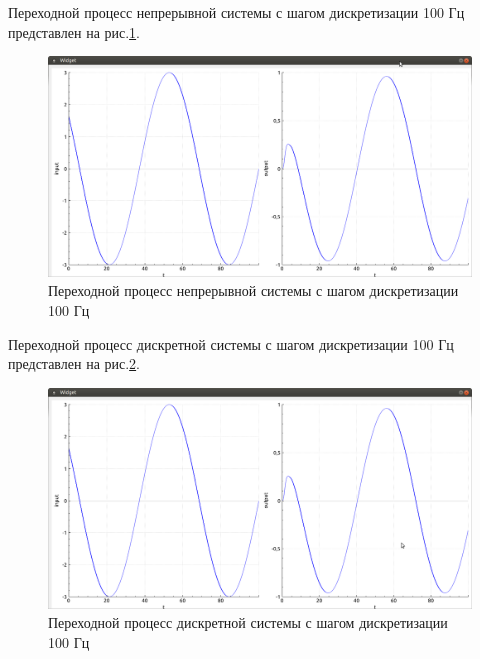 \documentclass[14pt,a4paper]{extreport}
\begin{document}
Переходной процесс непрерывной системы с шагом дискретизации 
100 Гц представлен на рис.\ref{fig:con_100hz}.
\begin{figure}[H]
    \centering
    \includegraphics[width=160mm]{img/con_100hz.png}
    \caption{Переходной процесс непрерывной системы с шагом дискретизации 100 Гц}
    \label{fig:con_100hz}
\end{figure}

Переходной процесс дискретной системы с шагом дискретизации 
100 Гц представлен на рис.\ref{fig:dis_100hz}.

\begin{figure}[H]
    \centering
    \includegraphics[width=160mm]{img/dis_100hz.png}
    \caption{Переходной процесс дискретной системы 
    с шагом дискретизации 100 Гц}
    \label{fig:dis_100hz}
\end{figure}
\end{document}
